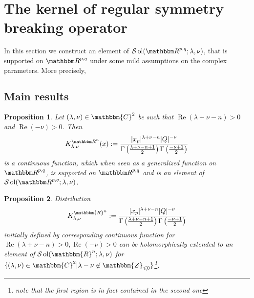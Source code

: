 \documentclass{article}
\newcommand{\assign}{:=}
\newcommand{\nin}{\not\in}
\newcommand{\tmop}[1]{\ensuremath{\operatorname{#1}}}
\newcommand{\um}{-}
\numberwithin{definition}{section}
\numberwithin{lemma}{section}
\newtheorem{proposition}{Proposition}
\numberwithin{proposition}{section}
{\theorembodyfont{\rmfamily}\newtheorem{remark}{Remark}
\numberwithin{remark}{section}
}
\newcommand{\C}{{\mathbbm{C}}}\newcommand{\Z}{{\mathbbm{Z}}}
\begin{document}
\section{The kernel of regular symmetry breaking operator}\label{sec:supp-R}

In this section we construct an element of $\mathcal{S} \tmop{ol} ( \R^{p, q}
; \lambda, \nu)$, that is supported on $\R^{p, q}$ under some mild assumptions
on the complex parameters. More precisely,

\subsection{Main results}

\begin{proposition}
  \label{supp-R:prop-regular}Let $(\lambda, \nu) \in \C^2$ be such that
  $\tmop{Re} (\lambda + \nu - n) > 0$ and $\tmop{Re} (- \nu) > 0$. Then
  \[ K_{\lambda, \nu}^{\R^n} (x) \assign \frac{| x_p |^{\lambda + \nu - n} | Q
     |^{\um \nu}}{\Gamma \left( \frac{\lambda + \nu - n + 1}{2} \right) \Gamma
     \left( \frac{- \nu + 1}{2} \right)} \]
  is a continuous function, which when seen as a generalized function on
  $\R^{p, q}$, is supported on $\R^{p, q}$ and is an element of $\mathcal{S}
  \tmop{ol} ( \R^{p, q} ; \lambda, \nu)$.
\end{proposition}

\begin{proposition}
  \label{supp-R:prop-3}Distribution
  \[ K^{\mathbbm{R}^n}_{\lambda, \nu} \assign \frac{| x_p |^{\lambda + \nu -
     n} | Q |^{\um \nu}}{\Gamma \left( \frac{\lambda + \nu - n + 1}{2} \right)
     \Gamma \left( \frac{- \nu + 1}{2} \right)} \]
  initially defined by corresponding continuous function for $\tmop{Re} (
  \lambda + \nu - n) > 0, \tmop{Re} ( - \nu) > 0$ can be holomorphically
  extended to an element of $\mathcal{S} \tmop{ol} ( \mathbbm{R}^n ; \lambda,
  \nu)$ for $\{ ( \lambda, \nu) \in \mathbbm{C}^2 | \lambda \um \nu \nin
  \mathbbm{Z}_{\leqslant 0} \}${\footnote{note that the first region is in
  fact contained in the second one}}.
\end{proposition}
\end{document}

